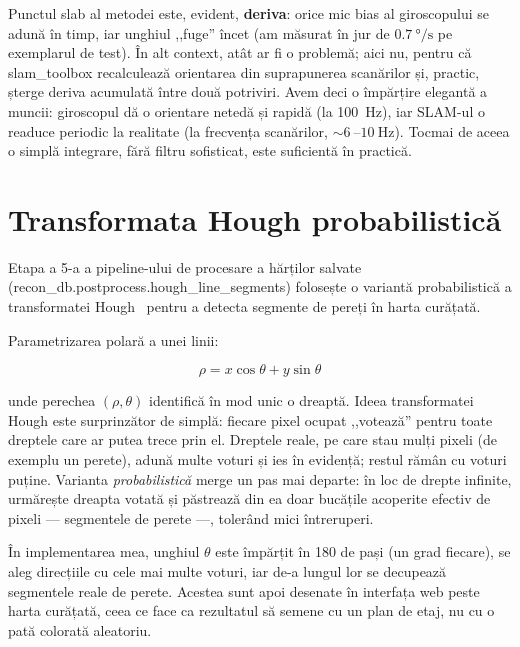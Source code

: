 \documentclass[a4paper,12pt,twoside,openany]{report}
\renewcommand{\texttt}[1]{\textnormal{#1}}
\begin{document}
Punctul slab al metodei este, evident, \textbf{deriva}: orice mic bias al
giroscopului se adună în timp, iar unghiul ,,fuge'' încet (am măsurat în jur de
$\SI{0.7}{\degree\per\second}$ pe exemplarul de test). În alt context, atât ar
fi o problemă; aici nu, pentru că slam\_toolbox recalculează orientarea din
suprapunerea scanărilor și, practic, șterge deriva acumulată între două
potriviri. Avem deci o împărțire elegantă a muncii: giroscopul dă o orientare
netedă și rapidă (la \SI{100}{\hertz}), iar SLAM-ul o readuce periodic la
realitate (la frecvența scanărilor, $\sim\SI{6}{}$--$\SI{10}{\hertz}$). Tocmai
de aceea o simplă integrare, fără filtru sofisticat, este suficientă în
practică.

\section{Transformata Hough probabilistică}
\label{sec:hough}

Etapa a 5-a a pipeline-ului de procesare a hărților salvate
(\texttt{recon\_db.\allowbreak postprocess.\allowbreak hough\_line\_segments}) folosește o
variantă probabilistică a transformatei Hough~\cite{hough1962, dudahart1972,
matas2000probhough} pentru a detecta segmente de pereți în harta curățată.

Parametrizarea polară a unei linii:

\begin{equation}\label{eq:hough-rho}
    \rho = x \cos\theta + y \sin\theta
\end{equation}

\noindent unde perechea $(\rho, \theta)$ identifică în mod unic o dreaptă.
Ideea transformatei Hough este surprinzător de simplă: fiecare pixel ocupat
,,votează'' pentru toate dreptele care ar putea trece prin el. Dreptele reale,
pe care stau mulți pixeli (de exemplu un perete), adună multe voturi și ies în
evidență; restul rămân cu voturi puține. Varianta \textit{probabilistică}
merge un pas mai departe: în loc de drepte infinite, urmărește dreapta votată
și păstrează din ea doar bucățile acoperite efectiv de pixeli — segmentele de
perete —, tolerând mici întreruperi.

În implementarea mea, unghiul $\theta$ este împărțit în 180 de pași (un grad
fiecare), se aleg direcțiile cu cele mai multe voturi, iar de-a lungul lor se
decupează segmentele reale de perete. Acestea sunt apoi desenate în interfața
web peste harta curățată, ceea ce face ca rezultatul să semene cu un plan de
etaj, nu cu o pată colorată aleatoriu.
\end{document}

